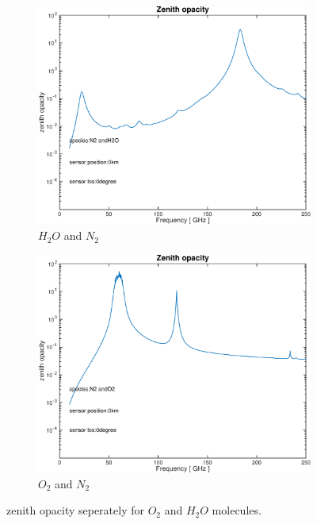 \documentclass[paper=a4, fontsize=11pt]{scrartcl} %
\begin{document}
\begin{figure}[t!]
 \centering
 \begin{subfigure}[t]{0.45\textwidth}
 \includegraphics[width=\textwidth]{plots/opacity_N2+H2O_0km_0deg.pdf}
 \caption{$H_{2}O$ and $N_{2}$}
 \end{subfigure}
 \begin{subfigure}[t]{0.45\textwidth}
 \includegraphics[width=\textwidth]{plots/opacity_N2+O2_0km_0deg.pdf}
 \caption{$O_{2}$ and $N_{2}$}
 \end{subfigure}
 \caption{zenith opacity seperately for $O_{2}$ and $H_{2}O$ molecules. }
 \label{figure:abs_molucules}
\end{figure}
\end{document}

